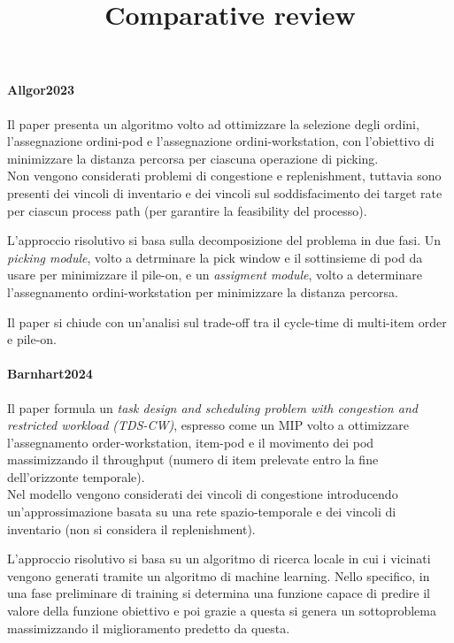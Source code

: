 \documentclass{article}
\title{Comparative review}
\begin{document}
\maketitle	

\paragraph{Allgor2023 \cite{Allgor2023}}
Il paper presenta un algoritmo volto ad ottimizzare la selezione degli ordini, l'assegnazione ordini-pod e l'assegnazione ordini-workstation, con l'obiettivo di minimizzare la distanza percorsa per ciascuna operazione di picking. \\
Non vengono considerati problemi di congestione e replenishment, tuttavia sono presenti dei vincoli di inventario e dei vincoli sul soddisfacimento dei target rate per ciascun process path (per garantire la feasibility del processo).

L'approccio risolutivo si basa sulla decomposizione del problema in due fasi. Un \emph{picking module}, volto a detrminare la pick window e il sottinsieme di pod da usare per minimizzare il pile-on, e un \emph{assigment module}, volto a determinare l'assegnamento ordini-workstation per minimizzare la distanza percorsa. 

Il paper si chiude con un'analisi sul trade-off tra il cycle-time di multi-item order e pile-on.




\paragraph{Barnhart2024 \cite{Barnhart2024}}
Il paper formula un \emph{task design and scheduling problem with congestion and restricted workload (TDS-CW)}, espresso come un MIP volto a ottimizzare l'assegnamento order-workstation, item-pod e il movimento dei pod massimizzando il throughput (numero di item prelevate entro la fine dell'orizzonte temporale). \\
Nel modello vengono considerati dei vincoli di congestione introducendo un'approssimazione basata su una rete spazio-temporale e dei vincoli di inventario (non si considera il replenishment).

L'approccio risolutivo si basa su un algoritmo di ricerca locale in cui i vicinati vengono generati tramite un algoritmo di machine learning. Nello specifico, in una fase preliminare di training si determina una funzione capace di predire il valore della funzione obiettivo e poi grazie a questa si genera un sottoproblema massimizzando il miglioramento predetto da questa.
\end{document}
